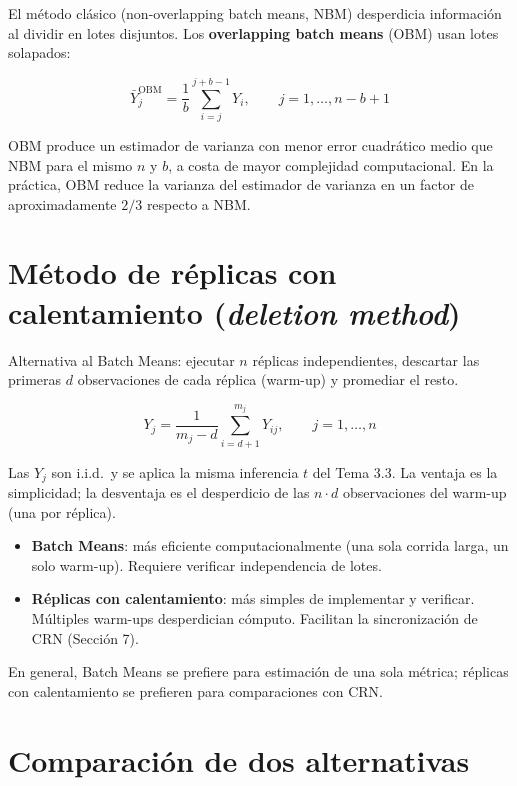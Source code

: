 \documentclass[11pt, letterpaper]{article}
\begin{document}
El método clásico (non-overlapping batch means, NBM) desperdicia información al dividir en lotes disjuntos. Los \textbf{overlapping batch means} (OBM) usan lotes solapados:

\[
\bar Y_j^{\text{OBM}} = \frac{1}{b}\sum_{i=j}^{j+b-1} Y_i, \qquad j = 1,\ldots,n-b+1
\]

OBM produce un estimador de varianza con menor error cuadrático medio que NBM para el mismo $n$ y $b$, a costa de mayor complejidad computacional. En la práctica, OBM reduce la varianza del estimador de varianza en un factor de aproximadamente $2/3$ respecto a NBM.

\section{Método de réplicas con calentamiento (\emph{deletion method})}

Alternativa al Batch Means: ejecutar $n$ réplicas independientes, descartar las primeras $d$ observaciones de cada réplica (warm-up) y promediar el resto.

\[
Y_j = \frac{1}{m_j - d}\sum_{i=d+1}^{m_j} Y_{ij}, \qquad j = 1,\ldots,n
\]

Las $Y_j$ son i.i.d.\ y se aplica la misma inferencia $t$ del Tema 3.3. La ventaja es la simplicidad; la desventaja es el desperdicio de las $n \cdot d$ observaciones del warm-up (una por réplica).

\begin{notabox}
\begin{itemize}
    \item \textbf{Batch Means}: más eficiente computacionalmente (una sola corrida larga, un solo warm-up). Requiere verificar independencia de lotes.
    \item \textbf{Réplicas con calentamiento}: más simples de implementar y verificar. Múltiples warm-ups desperdician cómputo. Facilitan la sincronización de CRN (Sección 7).
\end{itemize}
En general, Batch Means se prefiere para estimación de una sola métrica; réplicas con calentamiento se prefieren para comparaciones con CRN.
\end{notabox}

\section{Comparación de dos alternativas}
\end{document}

